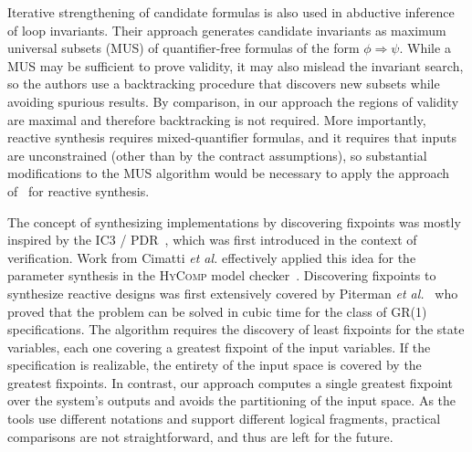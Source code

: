 Iterative strengthening of candidate formulas is also used in abductive inference~\cite{dillig2013inductive}
of loop invariants.
Their approach generates candidate invariants as maximum universal subsets (MUS) of quantifier-free formulas of the form $\phi \Rightarrow \psi$.
While a MUS may be sufficient to prove validity, it may also mislead the invariant search, so the authors use a backtracking procedure that discovers new subsets while avoiding spurious results. By comparison, in our approach the regions of validity are maximal and therefore backtracking is not required.  More importantly, reactive synthesis requires mixed-quantifier formulas, and it requires that inputs are unconstrained (other than by the contract assumptions), so substantial modifications to the MUS algorithm would be necessary to apply the approach of~\cite{dillig2013inductive} for reactive synthesis.  %

The concept of synthesizing implementations by discovering fixpoints was mostly
inspired by the IC3 / PDR~\cite{bradley2011sat,een2011efficient}, which was first introduced
in the context of verification. Work from Cimatti \textit{et al.} effectively
applied this idea for the parameter synthesis in the
\textsc{HyComp} model checker~\cite{DBLP:conf/fmcad/CimattiGMT13, cimatti2015hycomp}.
Discovering fixpoints to synthesize reactive designs was first
extensively covered by Piterman \textit{et al.}~\cite{piterman2006synthesis}
who proved that the problem can be solved in cubic time for the class of GR(1) specifications.
The algorithm requires the discovery of least fixpoints for the state variables,
each one covering a greatest fixpoint of the input variables. If the specification
is realizable, the entirety of the input space is covered by the greatest fixpoints.
In contrast, our approach computes a single greatest fixpoint over the system's outputs and avoids the partitioning of the input space.  As the tools use different notations and support different logical fragments, practical comparisons are not straightforward, and thus are left for the future.

